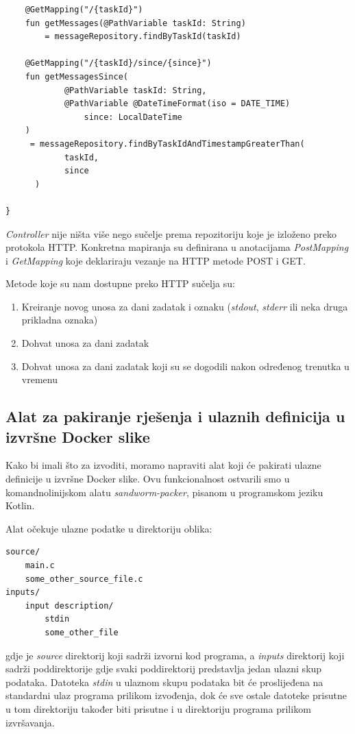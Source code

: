 \documentclass[times, utf8, zavrsni]{fer}
\begin{document}
{\begin{lstlisting}
    @GetMapping("/{taskId}")
    fun getMessages(@PathVariable taskId: String)
	 	= messageRepository.findByTaskId(taskId)

    @GetMapping("/{taskId}/since/{since}")
    fun getMessagesSince(
            @PathVariable taskId: String,
            @PathVariable @DateTimeFormat(iso = DATE_TIME)
				since: LocalDateTime
    )
     = messageRepository.findByTaskIdAndTimestampGreaterThan(
	  		taskId,
			since
	  )

}
\end{lstlisting}

{\textit{Controller}} nije ništa više nego sučelje prema repozitoriju koje je izloženo preko protokola HTTP. Konkretna mapiranja su definirana u anotacijama {\textit{PostMapping}} i {\textit{GetMapping}} koje deklariraju vezanje na HTTP metode POST i GET.

\hfill
\break

Metode koje su nam dostupne preko HTTP sučelja su:

\begin{enumerate}
\item Kreiranje novog unosa za dani zadatak i oznaku ({\textit{stdout}}, {\textit{stderr}} ili neka druga prikladna oznaka)
\item Dohvat unosa za dani zadatak
\item Dohvat unosa za dani zadatak koji su se dogodili nakon određenog trenutka u vremenu
\end{enumerate}

\subsection{Alat za pakiranje rješenja i ulaznih definicija u izvršne Docker slike}

Kako bi imali što za izvoditi, moramo napraviti alat koji će pakirati ulazne definicije u izvršne Docker slike. Ovu funkcionalnost ostvarili smo u komandnolinijskom alatu {\textit{sandworm-packer}}, pisanom u programskom jeziku Kotlin.

Alat očekuje ulazne podatke u direktoriju oblika:

\begin{lstlisting}
source/
    main.c
    some_other_source_file.c
inputs/
    input description/
        stdin
        some_other_file
\end{lstlisting}

gdje je {\textit{source}} direktorij koji sadrži izvorni kod programa, a {\textit{inputs}} direktorij koji sadrži poddirektorije gdje svaki poddirektorij predstavlja jedan ulazni skup podataka. Datoteka {\textit{stdin}} u ulaznom skupu podataka bit će proslijeđena na standardni ulaz programa prilikom izvođenja, dok će sve ostale datoteke prisutne u tom direktoriju također biti prisutne i u direktoriju programa prilikom izvršavanja.

}
\end{document}
